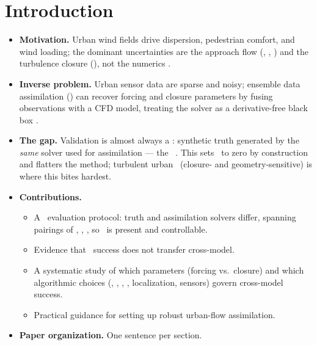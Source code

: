 \section{Introduction}
\label{sec:introduction}


\begin{itemize}
  \item \textbf{Motivation.} Urban wind fields drive dispersion, pedestrian
        comfort, and wind loading; the dominant uncertainties are the approach
        flow (\inflowangle, \velmag, \shearexp) and the turbulence closure
        (\sgs), not the numerics \cite{britter2003flow,xie2009modelling}.
  \item \textbf{Inverse problem.} Urban sensor data are sparse and noisy;
        ensemble data assimilation (\esmda) can recover forcing and closure
        parameters by fusing observations with a CFD model, treating the solver
        as a derivative-free black box
        \cite{emerick2013esmda,kikumoto2018bayesian,xue2017inverse}.
  \item \textbf{The gap.} Validation is almost always a \twinexp: synthetic
        truth generated by the \emph{same} solver used for assimilation --- the
        \invcrime\ \cite{kaipio2005statistical,wirgin2004inverse}. This sets
        \discrepancy\ to zero by construction and flatters the method; turbulent
        urban \les\ (closure- and geometry-sensitive) is where this bites
        hardest.
  \item \textbf{Contributions.}
        \begin{itemize}
          \item A \crossmodel\ evaluation protocol: truth and assimilation
                solvers differ, spanning pairings of \lbmmodel, \pyudales,
                \pypalm, so \discrepancy\ is present and controllable.
          \item Evidence that \twinexp\ success does not transfer cross-model.
          \item A systematic study of which parameters (forcing vs.\ closure)
                and which algorithmic choices (\Ne, \Na, \Nw, \Cd, localization,
                sensors) govern cross-model success.
          \item Practical guidance for setting up robust urban-flow assimilation.
        \end{itemize}
  \item \textbf{Paper organization.} One sentence per section.
\end{itemize}
